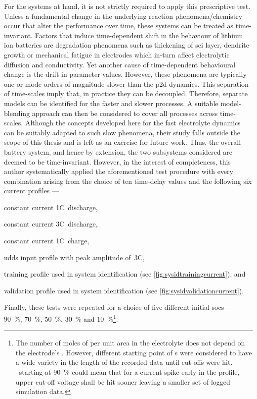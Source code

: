 For the systems at hand, it is  not strictly required to apply this prescriptive
test. Unless a fundamental change in the underlying reaction phenomena/chemistry
occur that  alter the  performance over  time, these systems  can be  treated as
time-invariant. Factors  that induce  time-dependent shift  in the  behaviour of
lithium ion batteries are degradation  phenomena such as thickening of \gls{sei}
layer, dendrite growth or mechanical  fatigue in electrodes which in-turn affect
electrolytic  diffusion and  conductivity. Yet  another cause  of time-dependent
behavioural change  is the drift  in parameter values. However,  these phenomena
are  typically  one or  mode  orders  of  magnitude  slower than  the  \gls{p2d}
dynamics.
This separation  of time-scales imply that, in
practice they can be decoupled. Therefore, separate models can be identified for
the faster and slower processes. A  suitable model-blending approach can then be
considered  to cover  all processes  across time-scales.  Although the  concepts
developed here for the fast electrolyte dynamics can be suitably adapted to such
slow phenomena, their study  falls outside the scope of this  thesis and is left
as an exercise for  future work. Thus, the overall battery  system, and hence by
extension,  the  two subsystems  considered  are  deemed to  be  time-invariant.
However, in the interest of completeness, this author systematically applied the
aforementioned test procedure with every  combination arising from the choice of
ten time-delay values and the following six current profiles ---
\begin{enumerate*}[label=\emph{\alph*})]
    \item constant current 1C~discharge,
    \item constant current 3C~discharge,
    \item constant current 1C~charge,
    \item \gls{udds} input profile with peak amplitude of~3C,
    \item training profile used in system identification (see \cref{fig:sysidtrainingcurrent}), and
    \item validation profile used in system identification (see \cref{fig:sysidvalidationcurrent}).
\end{enumerate*}
Finally,  these tests  were  repeated for  a choice  of  five different  initial
\glspl{soc}   ---   \SI{90}{\percent},   \SI{70}{\percent},   \SI{50}{\percent},
\SI{30}{\percent}  and \SI{10}{\percent}\footnote{\label{fn:socstart}The  number
of  moles  of   per  unit  area  in  the  electrolyte does  not  depend
on  the  electrode's .  However,  different  starting point  of
s were considered  to have a wide variety in  the length of the
recorded  data until  cut-offs  were hit.  \eg~starting at  \SI{90}{\percent}
 could  mean that  for a  current spike  early in  the profile,
upper  cut-off voltage  shall be  hit  sooner leaving  a smaller  set of  logged
simulation data.}.

